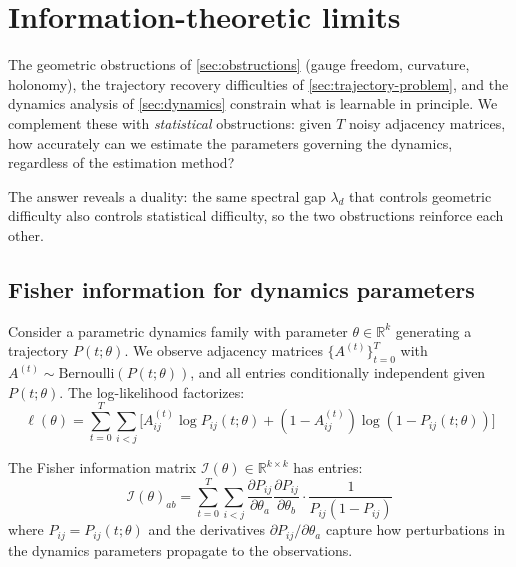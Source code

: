 \documentclass{article}
\newcommand{\RR}{\mathbb{R}}
\theoremstyle{plain}
\theoremstyle{definition}
\theoremstyle{remark}
\begin{document}


\section{Information-theoretic limits}\label{sec:info-theoretic}

The geometric obstructions of \cref{sec:obstructions} (gauge freedom, curvature, holonomy), the trajectory recovery difficulties of \cref{sec:trajectory-problem}, and the dynamics analysis of \cref{sec:dynamics} constrain what is learnable in principle.
We complement these with \emph{statistical} obstructions: given $T$ noisy adjacency matrices, how accurately can we estimate the parameters governing the dynamics, regardless of the estimation method?

The answer reveals a duality: the same spectral gap $\lambda_d$ that controls geometric difficulty also controls statistical difficulty, so the two obstructions reinforce each other.

\subsection{Fisher information for dynamics parameters}

Consider a parametric dynamics family with parameter $\theta \in \RR^k$ generating a trajectory $P(t; \theta)$.
We observe adjacency matrices $\{A^{(t)}\}_{t=0}^T$ with $A^{(t)} \sim \text{Bernoulli}(P(t; \theta))$, and all entries conditionally independent given $P(t; \theta)$.
The log-likelihood factorizes:
\begin{equation}
\ell(\theta) = \sum_{t=0}^T \sum_{i < j} \bigl[A_{ij}^{(t)} \log P_{ij}(t; \theta) + (1 - A_{ij}^{(t)}) \log(1 - P_{ij}(t; \theta))\bigr]
\end{equation}

The Fisher information matrix $\mathcal{I}(\theta) \in \RR^{k \times k}$ has entries:
\begin{equation}\label{eq:fisher}
\mathcal{I}(\theta)_{ab} = \sum_{t=0}^T \sum_{i < j} \frac{\partial P_{ij}}{\partial \theta_a} \frac{\partial P_{ij}}{\partial \theta_b} \cdot \frac{1}{P_{ij}(1 - P_{ij})}
\end{equation}
where $P_{ij} = P_{ij}(t; \theta)$ and the derivatives $\partial P_{ij} / \partial \theta_a$ capture how perturbations in the dynamics parameters propagate to the observations.
\end{document}
